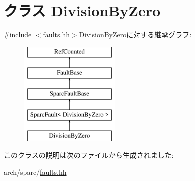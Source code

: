 \hypertarget{classSparcISA_1_1DivisionByZero}{
\section{クラス DivisionByZero}
\label{classSparcISA_1_1DivisionByZero}
}


{\ttfamily \#include $<$faults.hh$>$}DivisionByZeroに対する継承グラフ:\begin{figure}[H]
\begin{center}
\leavevmode
\includegraphics[height=5cm]{classSparcISA_1_1DivisionByZero}
\end{center}
\end{figure}


このクラスの説明は次のファイルから生成されました:\begin{DoxyCompactItemize}
\item 
arch/sparc/\hyperlink{arch_2sparc_2faults_8hh}{faults.hh}\end{DoxyCompactItemize}
